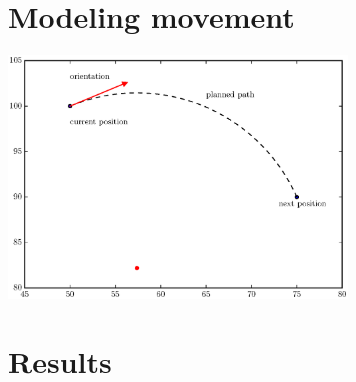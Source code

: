 \documentclass[10pt]{article}
\newenvironment{Figure}
  {\par\medskip\noindent\minipage{\linewidth}}
  {\endminipage\par\medskip}
\begin{document}
\begin{multicols}{2}
  \section*{Modeling movement}
  \begin{Figure}
    \includegraphics[width=9cm]{../plots/roc.eps}
     \label{fig:roc}
  \end{Figure}

  \section*{Results}
\end{multicols}
\end{document}
